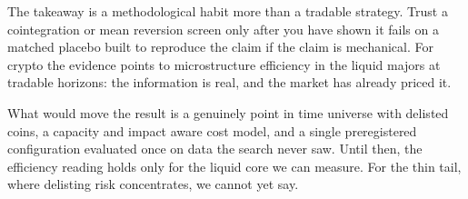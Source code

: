 \documentclass[11pt]{article}
\begin{document}
The takeaway is a methodological habit more than a tradable strategy. Trust a cointegration or
mean reversion screen only after you have shown it fails on a matched placebo built to reproduce
the claim if the claim is mechanical. For crypto the evidence points to microstructure efficiency in the liquid majors at
tradable horizons: the information is real, and the market has already priced it.

What would move the result is a genuinely point in time universe with delisted coins, a capacity and impact aware cost model, and a single preregistered configuration evaluated once on data the
search never saw. Until then, the efficiency reading holds only for the liquid core we can measure. For the thin tail,
where delisting risk concentrates, we cannot yet say.

\end{document}
